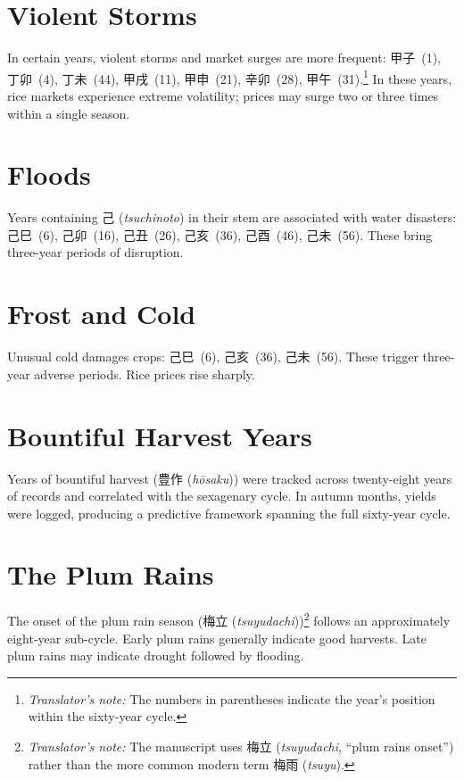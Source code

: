 \documentclass[10pt, openany]{book}
\newcommand{\jp}[1]{{\japanesefont #1}}
\newcommand{\tn}[1]{\footnote{\textit{Translator's note:} #1}}
\newcommand{\jt}[2]{\jp{#1} (\textit{#2})}
\begin{document}
\section{Violent Storms}

In certain years, violent storms and market surges are more frequent:
\jp{甲子}~(1), \jp{丁卯}~(4), \jp{丁未}~(44), \jp{甲戌}~(11),
\jp{甲申}~(21), \jp{辛卯}~(28), \jp{甲午}~(31).\tn{The numbers in
parentheses indicate the year's position within the sixty-year cycle.}
In these years, rice markets experience extreme volatility; prices may
surge two or three times within a single season.

\section{Floods}

Years containing \jp{己} (\textit{tsuchinoto}) in their stem are associated
with water disasters: \jp{己巳}~(6), \jp{己卯}~(16), \jp{己丑}~(26),
\jp{己亥}~(36),
\jp{己酉}~(46), \jp{己未}~(56). These bring three-year periods of
disruption.

\section{Frost and Cold}

Unusual cold damages crops: \jp{己巳}~(6), \jp{己亥}~(36),
\jp{己未}~(56). These trigger three-year adverse periods. Rice prices
rise sharply.

\section{Bountiful Harvest Years}

Years of bountiful harvest (\jt{豊作}{h\=osaku}) were tracked across
twenty-eight years of records and correlated with the sexagenary cycle. In
autumn months, yields were logged, producing a predictive framework
spanning the full sixty-year cycle.

\section{The Plum Rains}

The onset of the plum rain season (\jt{梅立}{tsuyudachi})\tn{%
The manuscript uses \jp{梅立} (\textit{tsuyudachi}, ``plum rains onset'')
rather than the more common modern term \jp{梅雨} (\textit{tsuyu}).} follows an
approximately eight-year sub-cycle. Early plum rains generally indicate good
harvests. Late plum rains may indicate drought followed by flooding.
\end{document}
